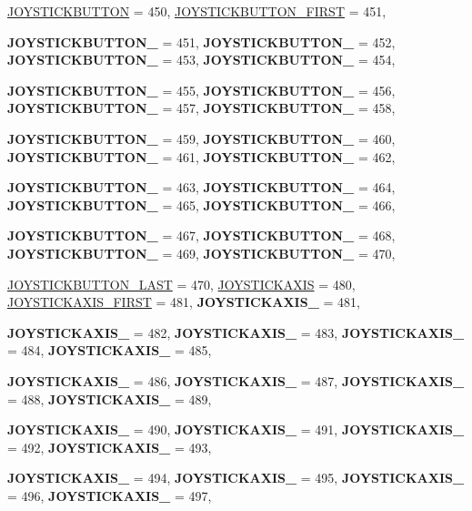 \begin{DoxyCompactItemize}
\hyperlink{classphys_1_1MetaCode_a3e501cbb5bf0f6f1fdb7211465bda8d8aaaa2af6a60a9cd7403aa4786ef1ea389}{JOYSTICKBUTTON} =  450, 
\hyperlink{classphys_1_1MetaCode_a3e501cbb5bf0f6f1fdb7211465bda8d8a88e7d7302a93326fdcc2181f96dc878e}{JOYSTICKBUTTON\_\-FIRST} =  451, 
\par
{\bfseries JOYSTICKBUTTON\_} =  451, 
{\bfseries JOYSTICKBUTTON\_} =  452, 
{\bfseries JOYSTICKBUTTON\_} =  453, 
{\bfseries JOYSTICKBUTTON\_} =  454, 
\par
{\bfseries JOYSTICKBUTTON\_} =  455, 
{\bfseries JOYSTICKBUTTON\_} =  456, 
{\bfseries JOYSTICKBUTTON\_} =  457, 
{\bfseries JOYSTICKBUTTON\_} =  458, 
\par
{\bfseries JOYSTICKBUTTON\_} =  459, 
{\bfseries JOYSTICKBUTTON\_} =  460, 
{\bfseries JOYSTICKBUTTON\_} =  461, 
{\bfseries JOYSTICKBUTTON\_} =  462, 
\par
{\bfseries JOYSTICKBUTTON\_} =  463, 
{\bfseries JOYSTICKBUTTON\_} =  464, 
{\bfseries JOYSTICKBUTTON\_} =  465, 
{\bfseries JOYSTICKBUTTON\_} =  466, 
\par
{\bfseries JOYSTICKBUTTON\_} =  467, 
{\bfseries JOYSTICKBUTTON\_} =  468, 
{\bfseries JOYSTICKBUTTON\_} =  469, 
{\bfseries JOYSTICKBUTTON\_} =  470, 
\par
\hyperlink{classphys_1_1MetaCode_a3e501cbb5bf0f6f1fdb7211465bda8d8a527375f3b27437b82cffd7c5fc2a14ac}{JOYSTICKBUTTON\_\-LAST} =  470, 
\hyperlink{classphys_1_1MetaCode_a3e501cbb5bf0f6f1fdb7211465bda8d8ab4e0e44b1cad95e292e9e436f3e59e0a}{JOYSTICKAXIS} =  480, 
\hyperlink{classphys_1_1MetaCode_a3e501cbb5bf0f6f1fdb7211465bda8d8a25c2eaee4c0cbf93209042779b1e2e99}{JOYSTICKAXIS\_\-FIRST} =  481, 
{\bfseries JOYSTICKAXIS\_} =  481, 
\par
{\bfseries JOYSTICKAXIS\_} =  482, 
{\bfseries JOYSTICKAXIS\_} =  483, 
{\bfseries JOYSTICKAXIS\_} =  484, 
{\bfseries JOYSTICKAXIS\_} =  485, 
\par
{\bfseries JOYSTICKAXIS\_} =  486, 
{\bfseries JOYSTICKAXIS\_} =  487, 
{\bfseries JOYSTICKAXIS\_} =  488, 
{\bfseries JOYSTICKAXIS\_} =  489, 
\par
{\bfseries JOYSTICKAXIS\_} =  490, 
{\bfseries JOYSTICKAXIS\_} =  491, 
{\bfseries JOYSTICKAXIS\_} =  492, 
{\bfseries JOYSTICKAXIS\_} =  493, 
\par
{\bfseries JOYSTICKAXIS\_} =  494, 
{\bfseries JOYSTICKAXIS\_} =  495, 
{\bfseries JOYSTICKAXIS\_} =  496, 
{\bfseries JOYSTICKAXIS\_} =  497, 

\end{DoxyCompactItemize}
